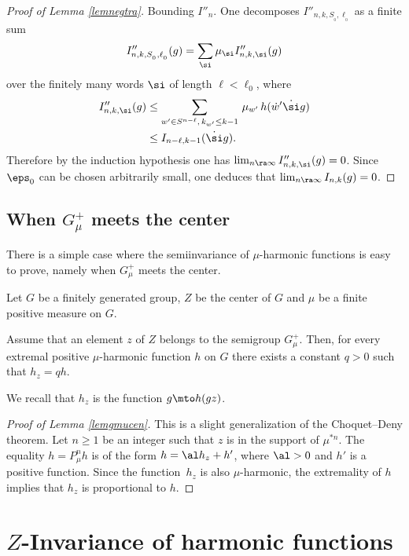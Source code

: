 \begin{proof}[Proof of Lemma \ref{lemnegtra}]
Bounding $I''_n$. One decomposes $I''_{n,k,S_{_0},\ell_{_0}}$
as a finite sum
\[
I''_{n,k,S_{_0},\ell_{_0}}(g)=\sum_{\si} \mu_{\si}I''_{n,k,\si}(g)
\]
over the finitely many words $\si$ of length $\ell<\ell_0$,
where
\begin{align*}
I''_{n,k,\si}(g)& \leq
\sum_{w'\in S^{n-\ell},\, k_{w'}\leq k-1}\, \mu_{w'}\, h({\dot{w}}'\dot{\si}g)\\
&\leq I_{n-\ell,k-1}(\dot{\si}g).
\end{align*}
Therefore by the induction hypothesis one has $\lim_{n\ra\infty}I''_{n,k,\si}(g)=0$.
Since $\eps_0$ can be chosen arbitrarily small, one deduces that
$\lim_{n\ra\infty}I_{n,k}(g)=0$.
\end{proof}

\subsection{When $G_\mu^+$ meets the center}
\label{secgmucen}

\bq
There is a simple case where the semiinvariance of $\mu$-harmonic
functions is easy to prove, namely when $G_\mu^+$ meets the center.
\eq

Let $G$ be a finitely generated group, $Z$ be the center of $G$ and
$\mu$ be a finite positive measure on $G$.

\begin{Lem}
\label{lemgmucen}
Assume that an element $z$ of $Z$
belongs to the semigroup $G_\mu^+$.
Then, for every extremal positive
$\mu$-harmonic function $h$ on $G$
there exists a constant $q>0$ such that $h_z=qh$.
\end{Lem}

We recall that $h_z$ is the function $g\mto h(gz)$.

\begin{proof}[Proof of Lemma \ref{lemgmucen}]
This is a slight generalization of the Choquet--Deny
theorem. Let $n\geq 1$ be an integer such that $z$ is in the support
of $\mu^{*n}$. The equality $h=P^n_\mu h$ is of the form
$h= \al h_z +h'$, where $\al>0$ and $h'$ is a positive function.
Since the function~$h_z$ is also $\mu$-harmonic, the extremality of $h$
implies that $h_z$ is proportional to $h$.
\end{proof}

\section{\texorpdfstring{$Z$}{Z}-Invariance of harmonic functions}
\label{secinvhar}

